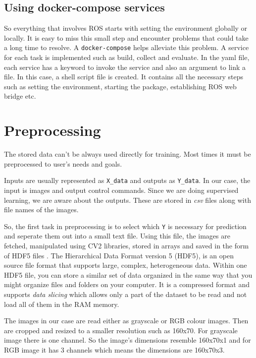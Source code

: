 \subsection{Using docker-compose services}
So everything that involves ROS starts with setting the environment globally or locally.
It is easy to miss this small step and encounter problems that could take a long time to
resolve. A \texttt{docker-compose} helps alleviate this problem. A service for each task
is implemented such as build, collect and evaluate. In the yaml file, each service has a
keyword to invoke the service and also an argument to link a file. In this case, a
shell script file is created. It contains all the necessary steps
such as setting the environment, starting the package, establishing ROS web bridge etc.
\fi

\section{Preprocessing}
The stored data can't be always used directly for training. Most times it must be
preprocessed to user's needs and goals.

Inputs are usually represented as \texttt{X\_{data}} and outputs as \texttt{Y\_{data}}. In our case, the input is images and output control commands.
Since we are doing supervised learning, we are aware about the outputs. These are stored in
\textit{csv} files along with file names of the images.

So, the first task in preprocessing is to select which \texttt{Y} is necessary for prediction
and seperate them out into a small text file. Using this file, the images are fetched,
manipulated using CV2 libraries, stored in arrays and saved in the form of HDF5 files
\cite{hdf5file}. The Hierarchical Data Format version 5 (HDF5), is an open source file format
that supports large, complex, heterogeneous data. Within one HDF5 file, you can store a similar set of data organized in the same way that you might organize files and folders on your computer.
It is a compressed format and supports \textit{data slicing} which allows only a part of
the dataset to be read and not load all of them in the RAM memory.

The images in our case are read either as grayscale or RGB colour images. Then are cropped
and resized to a smaller resolution such as 160x70. For grayscale image there is one
channel. So the image's dimensions resemble 160x70x1 and for RGB image it has 3 channels
which means the dimensions are 160x70x3.

